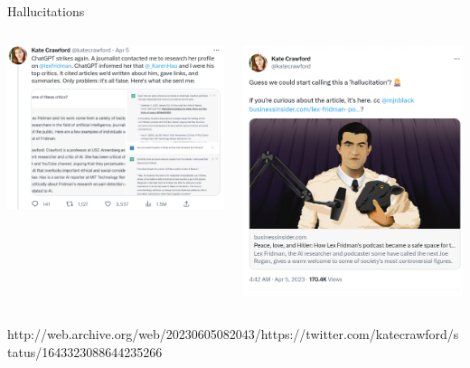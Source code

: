 \documentclass[aspectratio=169]{beamer}
\begin{document}
\begin{frame}{Hallucitations}
\begin{columns}[t]
\begin{column}{.6\textwidth}
    \centering
    \includegraphics[width=\textwidth]{Figures/Screenshot from 2023-06-05 18-24-24.png}
\end{column}
\begin{column}{.4\textwidth}
    \centering
        \includegraphics[width=\textwidth]{Figures/Screenshot from 2023-06-05 18-19-43.png}
\end{column}
\end{columns}
 
   http://web.archive.org/web/20230605082043/https://twitter.com/katecrawford/status/1643323088644235266
   
\end{frame}
\end{document}
